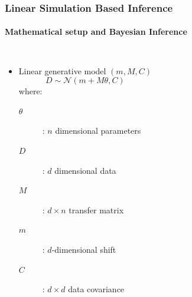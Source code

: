 \documentclass[aspectratio=169]{beamer}
\begin{document}
\begin{frame}
    \frametitle{Linear Simulation Based Inference}
    \framesubtitle{Mathematical setup and Bayesian Inference}
    \begin{columns}[t]
        \begin{itemize}
            \item Linear generative model $(m,M,C)$
                \[ D \sim \mathcal{N}(m + M \theta, C) \]
                where:
                \begin{description}
                    \item[$\theta$]: $n$ dimensional parameters
                    \item[$D$]: $d$ dimensional data
                    \item[$M$]: $d\times n$ transfer matrix
                    \item[$m$]: $d$-dimensional shift
                    \item[$C$]:  $d\times d$ data covariance
                \end{description}
        \end{itemize}


\end{columns}
\end{frame}
\end{document}
